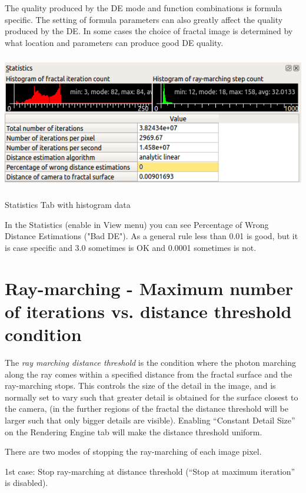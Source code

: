 The quality produced by the DE mode and function combinations is formula
specific. The setting of formula parameters can also greatly affect the
quality produced by the DE. In some cases the choice of fractal image is
determined by what location and parameters can produce good DE quality.

\includegraphics[width=5.72083in,height=2.32569in]{img/manual/media/image6.png}

Statistics Tab with histogram data

In the Statistics (enable in View menu) you can see Percentage of Wrong
Distance Estimations ("Bad DE"). As a general rule less than 0.01 is
good, but it is case specific and 3.0 sometimes is OK and 0.0001
sometimes is not.

\section{Ray-marching - Maximum number of iterations vs. distance
threshold
condition}\label{ray-marching---maximum-number-of-iterations-vs.-distance-threshold-condition}

The \emph{ray marching distance threshold} is the condition where the
photon marching along the ray comes within a specified distance from the
fractal surface and the ray-marching stops. This controls the size of
the detail in the image, and is normally set to vary such that greater
detail is obtained for the surface closest to the camera, (in the
further regions of the fractal the distance threshold will be larger
such that only bigger details are visible). Enabling ``Constant Detail
Size'' on the Rendering Engine tab will make the distance threshold
uniform.

There are two modes of stopping the ray-marching of each image pixel.

1st case: Stop ray-marching at distance threshold (``Stop at maximum
iteration'' is disabled).

